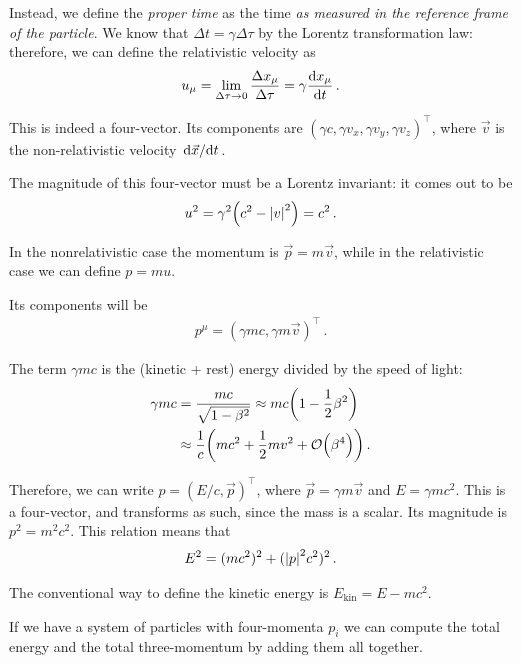 \documentclass[main.tex]{subfiles}
\begin{document}
Instead, we define the \emph{proper time} as the time \emph{as measured in the reference frame of the particle}. 
We know that \(\Delta t = \gamma \Delta \tau \) by the Lorentz transformation law: therefore, we can define the relativistic velocity as
%
\begin{align}
u_{\mu } = \lim_{ \Delta \tau \to 0} \frac{ \Delta x_{\mu }}{\Delta \tau } = \gamma \dv{x_{\mu }}{t}
\,.
\end{align}

This is indeed a four-vector.
Its components are \((\gamma c, \gamma v_x, \gamma v_y, \gamma v_z)^{\top}\), where \(\vec{v}\) is the non-relativistic velocity \(\dv*{\vec{x}}{t}\). 

The magnitude of this four-vector must be a Lorentz invariant: it comes out to be 
%
\begin{align}
u^2 = \gamma^2 \qty(c^2 - \abs{v}^2) = c^2
\,.
\end{align}

In the nonrelativistic case the momentum is \(\vec{p} = m \vec{v}\), while in the relativistic case we can define \(p = m u\). 

Its components will be 
%
\begin{align}
p^{\mu } = (\gamma m c, \gamma m \vec{v})^{\top}
\,.
\end{align}

The term \(\gamma mc\) is the (kinetic + rest) energy divided by the speed of light: 
%
\begin{subequations}
\begin{align}
\gamma mc &= \frac{mc}{\sqrt{1 - \beta^2}} \approx mc \qty(1 - \frac{1}{2} \beta^2)  \\
&\approx \frac{1}{c} \qty(mc^2 + \frac{1}{2} mv^2 + \order{\beta ^{4}})
\,.
\end{align}
\end{subequations}

Therefore, we can write \(p = (E/c, \vec{p})^{\top}\), where \(\vec{p} = \gamma m \vec{v}\) and \(E = \gamma m c^2\). 
This is a four-vector, and transforms as such, since the mass is a scalar. 
Its magnitude is \(p^2 = m^2 c^2\). 
This relation means that 
%
\begin{align}
E^2 = (mc^2)^2 + (\abs{p}^2 c^2)^2
\,.
\end{align}

The conventional way to define the kinetic energy is \(E _{\text{kin}} = E - mc^2\). 

If we have a system of particles with four-momenta \(p_i\) we can compute the total energy and the total three-momentum by adding them all together. 
\end{document}
